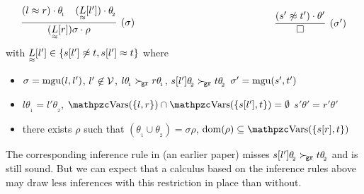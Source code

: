    \begin{definition}\label{def:unit:superposition:on:closures}
    \begin{gather*}
        \infer[(\sigma)]
        {(\underset{\mEQ}{L}[r])\sigma\cdot\rho}
        {(l\mEQ r)\cdot\theta_{\!_1} & (\underset{\mEQ}{L}[l'])\cdot\theta_{\!_2}}
    \hspace{5cm}
        \infer[(\sigma')]
        {\emptyclause}
        {(s'\mNE t')\cdot\theta'}
    \end{gather*}
    with \( \underset{\approx}{L}[l'] \in \{ s[l']\not\approx t, s[l']\approx t \} \) 
    where
    \begin{itemize}
        \item
        \( \sigma = \operatorname{mgu}(l,l') \),
        \( l'\not\in\mathcal{V} \),
        \( l\theta_{\!_1} \mathrel\succ_{\!\mathtt{gr}} r\theta_{\!_1} \),
        \( s[l']\theta_{\!_2} \mathrel\succ_{\!\mathtt{gr}} t\theta_{\!_2} \)
        \hfill \( \sigma' = \operatorname{mgu}(s',t') \)
        \item
        \( l\theta_{\!_1} = l'\theta_{\!_2} \),
        \( \var(\{l,r\}) \cap \var(\{ s[l'],t \}) = \emptyset \)
        \hfill \( s'\theta' = r'\theta' \)
        \item there exists
        \( \rho \) such that
        \( (\theta_{\!_1}\cup\theta_{\!_2}) = \sigma\rho \),
        \( \domain(\rho) \subseteq \var(\{ s[r],t \}) \)
    \end{itemize}
   \end{definition}

   \begin{remark}
    The corresponding inference rule in \cite{GK2004csl} (an earlier paper)
    misses \( s[l']\theta_{\!_2} \mathrel\succ_{\!\mathtt{gr}} t\theta_{\!_2} \) 
    and is still sound.
    But we can expect that a calculus based on the inference rules above 
    may draw less inferences with this restriction in place
    than without.
   \end{remark}

